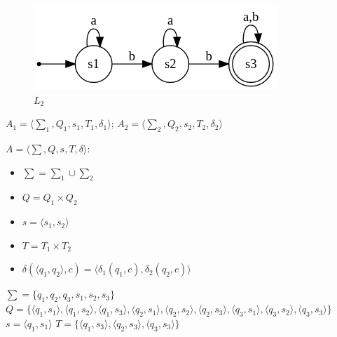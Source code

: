 \documentclass[a4paper,12pt]{article}
\begin{document}
\begin{figure}[h]
\centering
\includegraphics[scale=0.75]{1_2_2}
\caption{$L_2$}
\end{figure}

\begingroup
\raggedleft 
$A_1 = {\langle\sum_1 , Q_1, s_1, T_1, \delta_1 \rangle}$;
$A_2 = {\langle\sum_2 , Q_2, s_2, T_2, \delta_2 \rangle}$\newline
\endgroup
\begingroup
\raggedright 
$A = {\langle\sum , Q, s, T, \delta \rangle}$:
\begin{itemize}
\item $\sum = \sum_1 \cup \sum_2$
\item $Q = Q_1 \times Q_2$
\item $s = \langle s_1 , s_2\rangle$
\item $T = T_1 \times T_2$
\item $\delta(\langle q_1 , q_2\rangle, c) =  \langle \delta_1 (q_1 , c), \delta_2 (q_2, c) \rangle$
\end{itemize}
$\sum = \{q_1, q_2, q_3, s_1, s_2, s_3\}$\newline
\normalsize $Q = \{\langle q_1 , s_1 \rangle ,\langle q_1 , s_2 \rangle ,\langle q_1 , s_3 \rangle , \langle q_2 , s_1 \rangle , \langle q_2 , s_2 \rangle , \langle q_2 , s_3 \rangle , \langle q_3 , s_1 \rangle , \langle q_3 , s_2 \rangle , \langle q_3 , s_3 \rangle \}$\newline
\Large $s = \langle q_1 , s_1 \rangle$\newline
$T = \{\langle q_1 , s_3 \rangle ,\langle q_2 , s_3 \rangle ,\langle q_3 , s_3 \rangle\}$\newline
\end{document}
